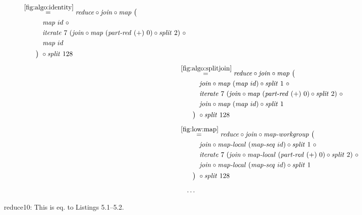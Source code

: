 \begin{figure*}[t]
\begin{align*}
\begin{aligned}
    &\overset{\ref{fig:algo:identity}}{=\hspace{.2em}}
      \reduce \circ \join \circ \map\ \big(\\
    &\qquad\quad\map\ id\ \circ \\
    &\qquad\quad\iterateN\ 7\ (\join \circ \map\ (\partRed\ (+)\ 0) \circ \splitN\ 2)\ \circ\\
    &\qquad\quad\map\ id\\
    &\qquad\big)\ \circ \splitN\ 128
  \end{aligned}\\[.5em]
%
  &\hspace{-2em}\quad\begin{aligned}
    &\overset{\ref{fig:algo:splitjoin}}{=\hspace{.2em}}
      \reduce \circ \join \circ \map\ \big(\\
    &\qquad\quad\join \circ \map\ (\map\ id) \circ \splitN\ 1\ \circ\\
    &\qquad\quad\iterateN\ 7\ (\join \circ \map\ (\partRed\ (+)\ 0) \circ \splitN\ 2)\ \circ\\
    &\qquad\quad\join \circ \map\ (\map\ id) \circ \splitN\ 1\\
    &\qquad\big)\ \circ \splitN\ 128
  \end{aligned}\\[.5em]
%
  &\hspace{-2em}\quad\begin{aligned}
    &\overset{\ref{fig:low:map}}{=\hspace{.2em}}
      \reduce \circ \join \circ \mapWorkgroup\ \big(\\
    &\qquad\quad\join \circ \mapLocal\ (\mapSeq\ id) \circ \splitN\ 1\ \circ\\
    &\qquad\quad\iterateN\ 7\ (\join \circ \mapLocal\ (\partRed\ (+)\ 0) \circ \splitN\ 2)\ \circ\\
    &\qquad\quad\join \circ \mapLocal\ (\mapSeq\ id) \circ \splitN\ 1\\
    &\qquad\big)\ \circ \splitN\ 128
  \end{aligned}\\[.5em]
%
  &\ldots
\end{align*}
\caption{reduce10: This is eq. to Listings 5.1--5.2.}
\end{figure*}

